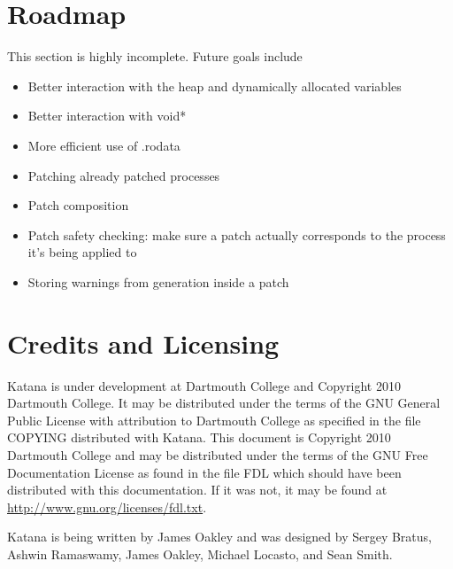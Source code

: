 \documentclass[11pt]{article}
\begin{document}
\section{Roadmap}
\label{sec-10}

  This section is highly incomplete. Future goals include
\begin{itemize}
\item Better interaction with the heap and dynamically allocated variables
\item Better interaction with void*
\item More efficient use of .rodata
\item Patching already patched processes
\item Patch composition
\item Patch safety checking: make sure a patch actually corresponds to
    the process it's being applied to
\item Storing warnings from generation inside a patch
\end{itemize}
\section{Credits and Licensing}
\label{sec-11}

  Katana is under development at Dartmouth College and Copyright 2010
  Dartmouth College. It may be distributed under the terms of the GNU
  General Public License with attribution to Dartmouth College as
  specified in the file COPYING distributed with Katana. This document
  is Copyright 2010 Dartmouth College and may be distributed under the
  terms of the GNU Free Documentation License as found in the file FDL
  which should have been distributed with this documentation. If it
  was not, it may be found at \href{http://www.gnu.org/licenses/fdl.txt}{http://www.gnu.org/licenses/fdl.txt}.

  Katana is being written by James Oakley and was designed
  by Sergey Bratus, Ashwin Ramaswamy, James Oakley, Michael Locasto,
  and Sean Smith.
\end{document}
